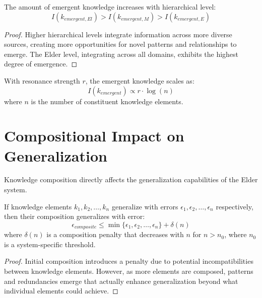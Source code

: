 \begin{theorem}
The amount of emergent knowledge increases with hierarchical level:
\begin{equation}
I(k_{emergent, El}) > I(k_{emergent, M}) > I(k_{emergent, E})
\end{equation}
\end{theorem}

\begin{proof}
Higher hierarchical levels integrate information across more diverse sources, creating more opportunities for novel patterns and relationships to emerge. The Elder level, integrating across all domains, exhibits the highest degree of emergence.
\end{proof}

\begin{theorem}
With resonance strength $r$, the emergent knowledge scales as:
\begin{equation}
I(k_{emergent}) \propto r \cdot \log(n)
\end{equation}
where $n$ is the number of constituent knowledge elements.
\end{theorem}

\section{Compositional Impact on Generalization}

Knowledge composition directly affects the generalization capabilities of the Elder system.

\begin{theorem}
If knowledge elements $k_1, k_2, \ldots, k_n$ generalize with errors $\epsilon_1, \epsilon_2, \ldots, \epsilon_n$ respectively, then their composition generalizes with error:
\begin{equation}
\epsilon_{composite} \leq \min\{\epsilon_1, \epsilon_2, \ldots, \epsilon_n\} + \delta(n)
\end{equation}
where $\delta(n)$ is a composition penalty that decreases with $n$ for $n > n_0$, where $n_0$ is a system-specific threshold.
\end{theorem}

\begin{proof}
Initial composition introduces a penalty due to potential incompatibilities between knowledge elements. However, as more elements are composed, patterns and redundancies emerge that actually enhance generalization beyond what individual elements could achieve.
\end{proof}

